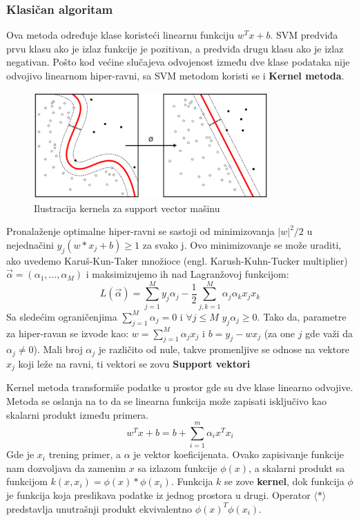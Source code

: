 \documentclass[12pt, letterpaper, oneside]{article}
\begin{document}
\subsubsection{Klasičan algoritam}
Ova metoda određuje klase koristeći linearnu funkciju $w^{T}x + b$. SVM predviđa prvu klasu ako je izlaz funkcije je pozitivan, a predviđa drugu klasu ako je izlaz negativan.
Pošto kod većine slučajeva odvojenost između dve klase podataka nije odvojivo linearnom hiper-ravni, sa SVM metodom koristi se i \textbf{Kernel metoda}.

\begin{figure}[ht]
    \centering
    \includegraphics[width=0.8\textwidth]{files/512px-Kernel_Machine.png}
    \caption{Ilustracija kernela za support vector mašinu \cite{SvmImage}}
\end{figure}

Pronalaženje optimalne hiper-ravni se sastoji od minimizovanja $|w|^{2}/2$ u nejednačini $y_j(w*x_j+b) \geq 1$ za svako j. 
Ovo minimizovanje se može uraditi, ako uvedemo Karuš-Kun-Taker množioce (engl. Karush-Kuhn-Tucker multiplier) $\overrightarrow{\alpha} = (\alpha_1,...,\alpha_M)$ i maksimizujemo ih nad Lagranžovoj funkcijom:
\[
    L(\overrightarrow{\alpha}) = \sum_{j=1}^{M}{y_j\alpha_j} - \frac{1}{2}\sum_{j,k=1}^{M}{\alpha_j\alpha_kx_jx_k}
\]
Sa sledećim ograničenjima $\sum_{j=1}^{M}{\alpha_j=0}$ i $\forall j \leq M $ $y_j\alpha_j \geq 0$. Tako da, parametre za hiper-ravan se izvode kao:
$w = \sum_{j=1}^{M}\alpha_jx_j$ i $b = y_j - wx_j$ (za one $j$ gde važi da $\alpha_j \neq 0$). Mali broj $\alpha_j$ je različito od nule, takve promenljive se odnose na vektore $x_j$ koji leže na ravni,
ti vektori se zovu \textbf{Support vektori} \cite{rebentrost2014quantum}

Kernel metoda transformiše podatke u prostor gde su dve klase linearno odvojive. Metoda se oslanja na to da se linearna funkcija
može zapisati isključivo kao skalarni produkt između primera.
\[
    w^{T}x + b = b + \sum_{i=1}^m \alpha_i x^T x_i
\]
Gde je $x_i$ trening primer, a $\alpha$ je vektor koeficijenata. Ovako zapisivanje funkcije nam dozvoljava da zamenim $x$ sa izlazom funkcije $\phi(x)$, a skalarni produkt sa funkcijom $k(x,x_i) = \phi(x)*\phi(x_i)$.
Funkcija $k$ se zove \textbf{kernel}, dok funkcija $\phi$ je funkcija koja preslikava podatke iz jednog prostora u drugi. Operator $\langle * \rangle$ predstavlja unutrašnji produkt ekvivalentno $\phi(x)^T\phi(x_i)$. \cite{goodfellow2016deep}
\end{document}
